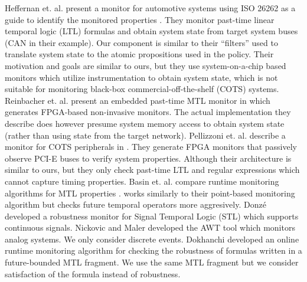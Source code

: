 Heffernan et. al. present a monitor for automotive systems using ISO 26262 as a guide
to identify the monitored properties  \cite{Heffernan2014}.
They monitor past-time linear temporal logic (LTL) formulas and obtain system state from target system buses (CAN in their example).
Our \sfmap component is similar to their ``filters'' used to translate system state to the atomic propositions used in the policy.
Their motivation and goals are similar to ours, but they use system-on-a-chip based
monitors which utilize instrumentation to obtain system state, which is not suitable for monitoring black-box commercial-off-the-shelf (COTS)
systems. Reinbacher et. al. present an embedded past-time MTL monitor in \cite{Reinbacher2013} which generates FPGA-based non-invasive monitors.
The actual implementation they describe does however presume system memory access to obtain system state (rather than using state from the target network).
Pellizzoni et. al. describe a monitor for COTS peripherals in \cite{Pellizzoni2008}.
They generate FPGA monitors that passively observe PCI-E buses to verify system properties.
Although their architecture is similar to ours, but they only check past-time LTL and
regular expressions which cannot capture timing properties.
Basin et. al. compare runtime monitoring algorithms for MTL properties \cite{Basin2012}.
\monitor works similarly to their point-based monitoring algorithm but \monitor checks
future temporal operators more aggresively.
Donz\'e \etal \cite{DFM13} developed a robustness monitor for Signal Temporal Logic (STL) which
supports continuous signals.
Nickovic and Maler \cite{NM07} developed the  AWT tool which monitors analog systems.
We only consider discrete events. Dokhanchi \etal \cite{DHF14}
developed an online runtime monitoring algorithm for checking the robustness of formulas written in a
future-bounded MTL fragment. We use the same MTL fragment but we consider satisfaction of the formula
instead of robustness.
